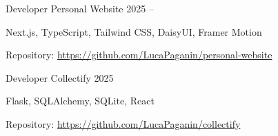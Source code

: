 \begin{cventries}

\cventry
{Developer} %
{Personal Website} %
{} %
{2025 -- } %
{ %
\begin{cvitems}
  \item {}
  \item Next.js, TypeScript, Tailwind CSS, DaisyUI, Framer Motion
  \item {Repository: \url{https://github.com/LucaPaganin/personal-website}}  
\end{cvitems}
}


\cventry
{Developer} %
{Collectify} %
{} %
{2025} %
{ %
\begin{cvitems}
  \item {}
  \item {}
  \item {}
  \item Flask, SQLAlchemy, SQLite, React
  \item {Repository: \url{https://github.com/LucaPaganin/collectify}}  
\end{cvitems}
}

\end{cventries}